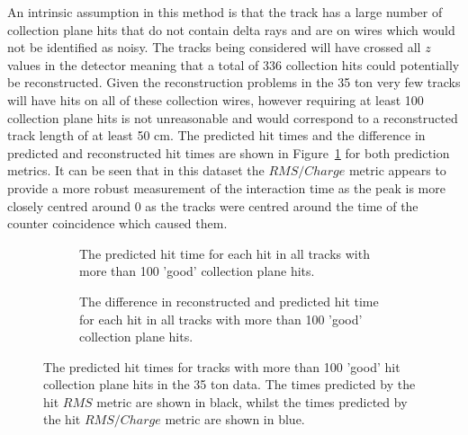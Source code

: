 An intrinsic assumption in this method is that the track has a large number of collection plane hits that do not contain delta rays and are on wires which would not be identified as noisy. The tracks being considered will have crossed all $z$ values in the detector meaning that a total of 336 collection hits could potentially be reconstructed. Given the reconstruction problems in the 35 ton very few tracks will have hits on all of these collection wires, however requiring at least 100 collection plane hits is not unreasonable and would correspond to a reconstructed track length of at least 50 cm. The predicted hit times and the difference in predicted and reconstructed hit times are shown in Figure~\ref{fig:DiffDataPredHit} for both prediction metrics. It can be seen that in this dataset the $RMS/Charge$ metric appears to provide a more robust measurement of the interaction time as the peak is more closely centred around 0 as the tracks were centred around the time of the counter coincidence which caused them. 

\begin{figure}[h!]
  \centering
  \begin{subfigure}{0.45\textwidth}
    \centering
    \caption{The predicted hit time for each hit in all tracks with more than 100 'good' collection plane hits.}
  \end{subfigure}
  \hspace{0.08\textwidth}
  \begin{subfigure}{0.45\textwidth}
    \centering
    \caption{The difference in reconstructed and predicted hit time for each hit in all tracks with more than 100 'good' collection plane hits.}
  \end{subfigure}
  \caption[The predicted hit times for tracks with more than 100 'good' hit collection plane hits in the 35 ton data]
          {The predicted hit times for tracks with more than 100 'good' hit collection plane hits in the 35 ton data. The times predicted by the hit $RMS$ metric are shown in black, whilst the times predicted by the hit $RMS/Charge$ metric are shown in blue.}
          \label{fig:DiffDataPredHit}
\end{figure}

